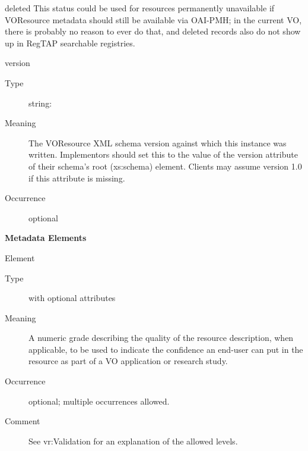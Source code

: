 \documentclass[11pt,a4paper]{ivoa}
\begin{document}
\begin{generated}
\begin{bigdescription}
\begin{description}
\begin{longtermsdescription}
\item[deleted]
	                   This status could be used for resources permanently
	                   unavailable if VOResource metadata should still be
	                   available via OAI-PMH; in the current VO, there is
	                   probably no reason to ever do that, and deleted
	                   records also do not show up in RegTAP searchable
	                   registries.

\end{longtermsdescription}
\end{description}
\item[version]
\begin{description}
\item[Type] string: 
\item[Meaning]
               The VOResource XML schema version
               against which this instance was written.
               Implementors should set this to the value of the version
               attribute of their schema's root (xs:schema) element.
               Clients may assume version 1.0 if this attribute is
               missing.

\item[Occurrence] optional
\end{description}


\end{bigdescription}\endgroup



\vspace{0.5ex}\noindent\textbf{ Metadata Elements}

\begingroup\small\begin{bigdescription}\item[Element \xmlel{validationLevel}]
\begin{description}
\item[Type]  with optional attributes
\item[Meaning]
                  A numeric grade describing the quality of the
                  resource description, when applicable,
                  to be used to indicate the confidence an end-user
                  can put in the resource as part of a VO application
                  or research study.

\item[Occurrence] optional; multiple occurrences allowed.
\item[Comment]
                  See vr:Validation for an explanation of the
                  allowed levels.


\end{description}
\end{bigdescription}
\end{generated}
\end{document}
